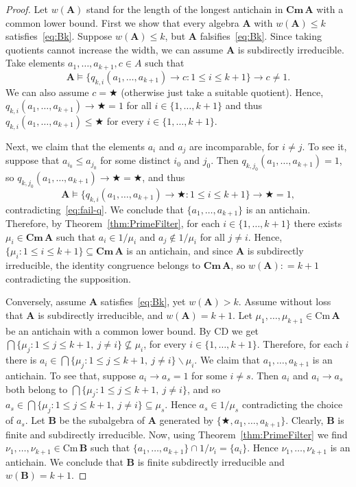 \documentclass{amsart}
\newcommand{\deq}{\mathrel{\mathop:}=}
\newcommand{\alg}[1]{\mathbf{#1}}
\newcommand{\Cm}[1]{\mathbf{Cm}\, #1}
\newcommand{\cm}[1]{\mathrm{Cm}\, #1}
\def\ra{\rightarrow}
\def\op{\bigstar}
\begin{document}
\begin{proof}
Let $w(\alg{A})$ stand for the length of the longest
antichain in $\Cm{\alg{A}}$ with a common lower bound.
First we show that every 
algebra $\alg{A}$ with $w(\alg{A})\leq k$ satisfies~\eqref{eq:Bk}. 
Suppose $w(\alg{A}) \leq k$, but $\alg{A}$ falsifies~\eqref{eq:Bk}.
Since taking quotients cannot increase the width, we can assume 
$\alg{A}$ is subdirectly irreducible. Take elements
$a_1,\dots,a_{k+1},c\in A$ such that
\begin{equation}\label{eq:fail-q}\tag{\dag}
\alg{A}\models
\{q_{k,i}(a_1,\dots,a_{k+1})\ra c:1\leq i\leq k+1\}\ra c\neq 1.
\end{equation}
We can also assume $c = \op$ (otherwise just take a suitable quotient).
Hence, $q_{k,i}(a_1,\dots,a_{k+1})\ra \op = 1$
for all $i\in\{1,\dots,k+1\}$ and thus $q_{k,i}(a_1,\dots,a_{k+1})\leq\op$
for every $i\in\{1,\dots,k+1\}$.

Next, we claim that the elements $a_i$ and $a_j$ are incomparable, for $i\neq j$.
To see it, suppose that $a_{i_0}\leq a_{j_0}$ for some
distinct $i_0$ and $j_0$. Then
$q_{k,{j_0}}(a_1,\dots,a_{k+1}) = 1$, so 
$q_{k,{j_0}}(a_1,\dots,a_{k+1})\ra\op = \op$, and thus
$$
\alg{A}\models
\{q_{k,i}(a_1,\dots,a_{k+1})\ra \op:1\leq i\leq k+1\}\ra \op = 1,
$$
contradicting~\eqref{eq:fail-q}.
We conclude that $\{a_1,\dots,a_{k+1}\}$ is an antichain.
Therefore, by Theorem~\ref{thm:PrimeFilter},
for each $i\in\{1,\dots,k+1\}$ there exists
$\mu_i\in \Cm{\alg{A}}$ such that $a_i\in 1/\mu_i$ and
$a_j\notin 1/\mu_i$ for all $j\neq i$. Hence,
$\{\mu_i: 1\leq i\leq k+1\}\subseteq\Cm{\alg{A}}$ is an antichain,
and since $\alg{A}$ is subdirectly irreducible, the identity congruence
belongs to $\Cm{\alg{A}}$, so $w(\alg{A}) \deq k+1$ contradicting the supposition.


Conversely, assume $\alg{A}$ satisfies~\eqref{eq:Bk}, yet $w(\alg{A})> k$.  
Assume without loss that $\alg{A}$ is subdirectly irreducible,
and $w(\alg{A}) = k+1$. Let $\mu_1,\dots,\mu_{k+1}\in\cm{\alg{A}}$ be an
antichain with a common lower bound. By CD we get
$\bigcap\{\mu_j: 1\leq j\leq k+1, \ j\neq i\} \not\subseteq \mu_i$,
for every $i\in \{1,\dots,k+1\}$. Therefore,
for each $i$ there is $a_i\in
\bigcap\{\mu_j: 1\leq j\leq k+1, \ j\neq i\}\smallsetminus \mu_i$. We claim that 
$a_1,\dots,a_{k+1}$ is an antichain. To see that,
suppose $a_i\ra a_s = 1$ for some $i\neq s$.
Then $a_i$ and $a_i\ra a_s$ both belong to
$\bigcap\{\mu_j: 1\leq j\leq k+1, \ j\neq i\}$, and so
$a_s\in \bigcap\{\mu_j: 1\leq j\leq k+1, \ j\neq i\}\subseteq \mu_s$.
Hence $a_s\in 1/\mu_s$ contradicting the choice of $a_s$.
Let $\alg{B}$ be the subalgebra of $\alg{A}$  generated by
$\{\op,a_1,\dots,a_{k+1}\}$. Clearly, $\alg{B}$ is finite and subdirectly
irreducible. Now, using Theorem~\ref{thm:PrimeFilter} 
we find $\nu_1,\dots,\nu_{k+1}\in \cm{\alg{B}}$ such that
$\{a_1,\dots,a_{k+1}\}\cap 1/\nu_i = \{a_i\}$. 
Hence $\nu_1,\dots,\nu_{k+1}$ is an antichain. 
We conclude that $\alg{B}$ is finite subdirectly irreducible and
$w(\alg{B}) = k+1$. 


\end{proof}
\end{document}
